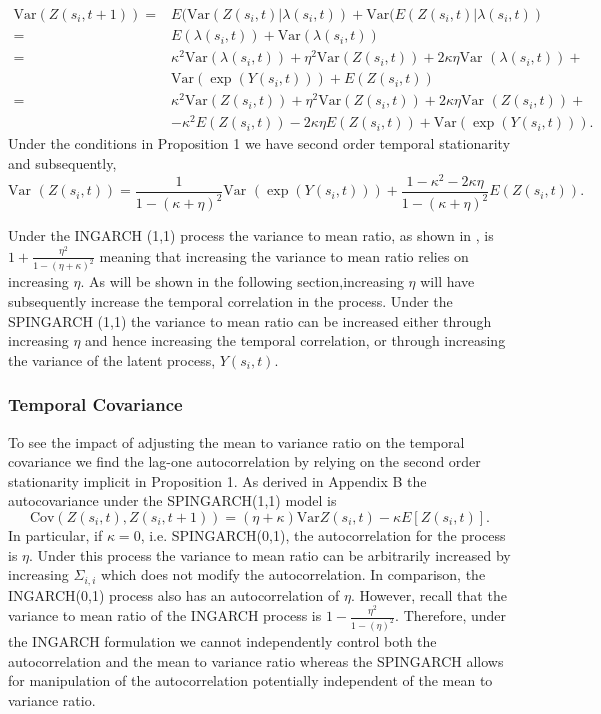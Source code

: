 \documentclass[11pt]{isuthesis}
\begin{document}
\begin{align}
	\mbox{Var}(Z(s_i,t+1))  =& E(\mbox{Var}(Z(s_i,t)|\lambda(s_i,t))+\mbox{Var}(E(Z(s_i,t)|\lambda(s_i,t))\\
	=& E(\lambda(s_i,t))+\mbox{Var}(\lambda(s_i,t)) \nonumber\\
	= & \kappa^2 \mbox{Var} (\lambda(s_i,t))+\eta^2 \mbox{Var}(Z(s_i,t))+2 \kappa \eta \mbox{Var }(\lambda(s_i,t))+\nonumber\\
	& \mbox{Var}(\exp(Y(s_i,t)))+E(Z(s_i,t))\\
	=&\kappa^2 \mbox{Var} (Z(s_i,t))+\eta^2 \mbox{Var}(Z(s_i,t))+2 \kappa \eta \mbox{Var }(Z(s_i,t))+\nonumber \nonumber\\
	& - \kappa^2 E(Z(s_i,t))-2 \kappa \eta E(Z(s_i,t))+\mbox{Var} (\exp(Y(s_i,t))).
\end{align}
Under the conditions in Proposition 1 we have second order temporal stationarity and subsequently,
\begin{equation}
	\mbox{Var }(Z(s_i,t))=\frac{1}{1-(\kappa+\eta)^2} \mbox{Var }(\exp(Y(s_i,t)))+\frac{1-\kappa^2-2\kappa \eta}{1-(\kappa+\eta)^2}E(Z(s_i,t)).
\end{equation}

Under the INGARCH (1,1) process the variance to mean ratio, as shown in \cite{ferland2006integer}, is $1+\frac{\eta^2}{1-(\eta+\kappa)^2}$ meaning that increasing the variance to mean ratio relies on increasing $\eta$.  As will be shown in the following section,increasing $\eta$ will have subsequently increase the temporal correlation in the process.  Under the SPINGARCH (1,1) the variance to mean ratio can be increased either through increasing $\eta$ and hence increasing the temporal correlation, or through increasing the variance of the latent process, $Y(s_i,t)$. 


\subsubsection{Temporal Covariance}

To see the impact of adjusting the mean to variance ratio on the temporal covariance we find the lag-one autocorrelation by relying on the second order stationarity implicit in Proposition 1.  As derived in Appendix B the autocovariance under the SPINGARCH(1,1) model is
\begin{equation}
	\mbox{Cov}(Z(s_i,t),Z(s_i,t+1))=\left(\eta+\kappa\right)\mbox{Var} Z(s_i,t)-\kappa E[Z(s_i,t)] \label{eq:Autocov}.
\end{equation}
In particular, if $\kappa=0$, i.e. SPINGARCH(0,1), the autocorrelation for the process is $\eta$.  Under this process the variance to mean ratio can be arbitrarily increased by increasing $\Sigma_{i,i}$ which does not modify the autocorrelation.  In comparison, the INGARCH(0,1) process also has an autocorrelation of $\eta$.  However, recall that the variance to mean ratio of the INGARCH process is $1-\frac{\eta^2}{1-(\eta)^2}$.  Therefore, under the INGARCH formulation we cannot independently control both the autocorrelation and the mean to variance ratio whereas the SPINGARCH allows for manipulation of the autocorrelation potentially independent of the mean to variance ratio.
\end{document}

